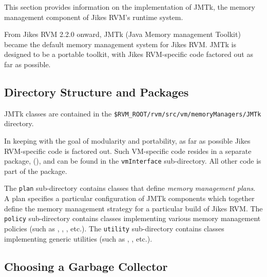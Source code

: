 
This section provides information on the implementation of JMTk, the
memory management component of Jikes\TMweb{} RVM's runtime system.

From Jikes RVM 2.2.0 onward, JMTk (Java Memory management
Toolkit) became the default memory management system for Jikes RVM.
JMTk is designed to be a portable toolkit, with Jikes
RVM-specific code factored out as far as possible.

\subsection{Directory Structure and Packages} \label{sssec:directories}

JMTk classes are contained in the
\texttt{\$RVM\_\-ROOT/rvm/src/vm/memoryManagers/JMTk} directory.

In keeping with the goal of modularity and portability, as far as
possible Jikes RVM-specific code is factored out.  Such VM-specific
code resides in a separate package,
(),
and can be found in the \texttt{vmInterface} sub-directory.  All other
code is part of the
package.

The \texttt{plan} sub-directory contains classes that define
\emph{memory management plans}.  A plan specifies a particular
configuration of JMTk components which together define the memory
management strategy for a particular build of Jikes RVM.  The
\texttt{policy} sub-directory contains classes implementing various
memory management policies (such as , , , etc.).  The \texttt{utility}
sub-directory contains classes implementing generic utilities (such as
,
, etc.).

\subsection{Choosing a Garbage Collector} \label{ssec:choosinggc}

